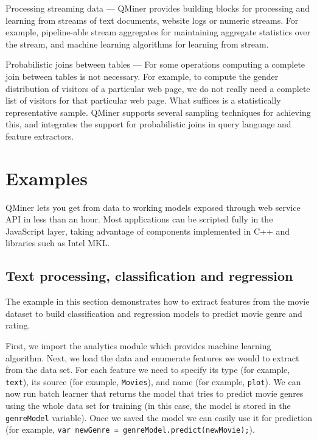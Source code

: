 \documentclass{article} %
\begin{document}
   Processing streaming data --- QMiner provides building blocks for processing and learning from streams of text documents, website logs or numeric streams. For example, pipeline-able stream aggregates for maintaining aggregate statistics over the stream, and machine learning algorithms for learning from stream.
   
   Probabilistic joins between tables --- For some operations computing a complete join between tables is not necessary. For example, to compute the gender distribution of visitors of a particular web page, we do not really need a complete list of visitors for that particular web page. What suffices is a statistically representative sample. QMiner supports several sampling techniques for achieving this, and integrates the support for probabilistic joins in query language and feature extractors.


\section{Examples}
   QMiner lets you get from data to working models exposed through web service API in less than an hour. Most applications can be scripted fully in the JavaScript layer, taking advantage of components implemented in C++ and libraries such as Intel MKL.

   \subsection{Text processing, classification and regression}
      The example in this section demonstrates how to extract features from the movie dataset to build classification and regression models to predict movie genre and rating. 
      
      First, we import the analytics module which provides machine learning algorithm. Next, we load the data and enumerate features we would to extract from the data set. For each feature we need to specify its type (for example, \texttt{text}), its source (for example, \texttt{Movies}), and name (for example, \texttt{plot}). We can now run batch learner that returns the model that tries to predict movie genres using the whole data set for training (in this case, the model is stored in the \texttt{genreModel} variable). Once we saved the model we can easily use it for prediction (for example, \texttt{var newGenre = genreModel.predict(newMovie);}). 
\end{document}
